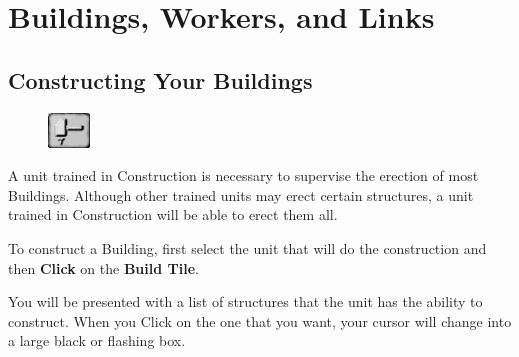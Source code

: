 
\chapter{Buildings, Workers, and Links}

\section{Constructing Your Buildings}


\begin{figure}
	\vspace{-20pt}
	\begin{center}
		\includegraphics[width=0.1\textwidth]{Thammer}
	\end{center}
	\vspace{-20pt}
\end{figure}

A unit trained in Construction is necessary to supervise the erection of most Buildings. Although other trained units may erect certain structures, a unit trained in Construction will be able to erect them all.

To construct a Building, first select the unit that will do the construction and then \textbf{Click} on the \textbf{Build Tile}.

You will be presented with a list of structures that the unit has the ability to construct. When you Click on the one that you want, your cursor will change into a large black or flashing box.

